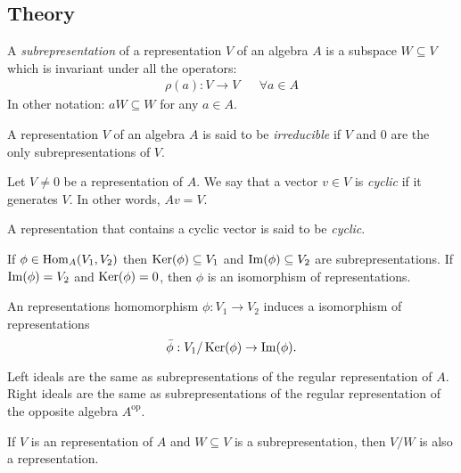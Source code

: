 \subsection*{Theory}

\begin{defn}
A \emph{subrepresentation} of a representation \(V\) of an algebra \(A\) is a subspace \(W\subseteq V\) which is invariant under all the operators: 
\begin{align*}\rho (a):V \rightarrow V && \forall a\in A\end{align*}
In other notation: \(aW\subseteq W\) for any \(a\in A.\)
\end{defn}

\begin{defn}\label{irreducible}
A representation \(V\) of an algebra \(A\) is said to be \emph{irreducible} if \(V\) and \(0\) are the only subrepresentations of \(V\).
\end{defn}

\begin{defn}\label{5}
Let $V\neq 0$ be a representation of $A$. We say that a vector $v\in V$ is \emph{cyclic} if it generates $V$. In other words, $Av=V$. 

A representation that contains a cyclic vector is said to be \emph{cyclic}.
\end{defn}

\begin{thm}\label{4}
If \(\phi \in \operatorname{Hom}_A(V_{1},V_{2})\) then \(\operatorname{Ker}(\phi )\subseteq V_{1}\) and \(\operatorname{Im}(\phi )\subseteq V_{2}\) are subrepresentations. If \(\operatorname{Im}(\phi )=V_{2}\) and \(\operatorname{Ker}(\phi )=0\), then \(\phi \) is an isomorphism of representations. 
\end{thm}

\begin{thm}\label{isomorphismtheorem}
An representations homomorphism \(\phi :V_{1}\rightarrow V_{2}\) induces a isomorphism of representations 
\[\bar{\phi } : V_{1}/\operatorname{Ker}(\phi ) \rightarrow  \operatorname{Im}(\phi ).\]
\end{thm}

\begin{thm}\label{ideal_is_sub}
Left ideals are the same as subrepresentations of the regular representation of \(A\). Right ideals are the same as subrepresentations of the regular representation of the opposite algebra \(A^{\text{op}}\).
\end{thm}

\begin{thm}\label{V/W_representation}
If \(V\) is an representation of \(A\) and \(W\subseteq V\) is a subrepresentation, then \(V/W\) is also a representation.
\end{thm}
